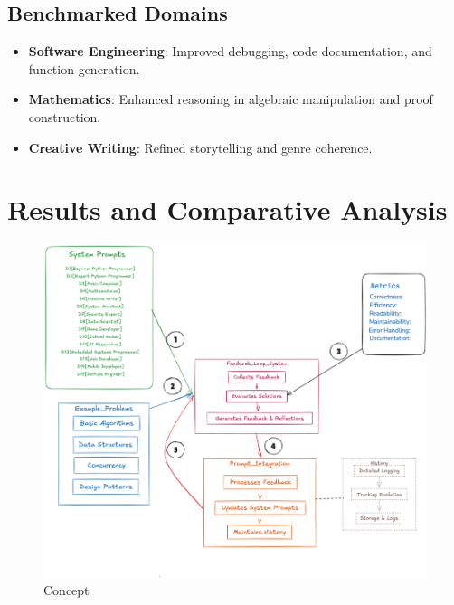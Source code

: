 \documentclass[10pt,a4paper,twocolumn]{article}
\begin{document}
\subsection{Benchmarked Domains}



\begin{itemize}
    \item \textbf{Software Engineering}: Improved debugging, code documentation, and function generation.
    \item \textbf{Mathematics}: Enhanced reasoning in algebraic manipulation and proof construction.
    \item \textbf{Creative Writing}: Refined storytelling and genre coherence.
\end{itemize}





\section{{\textbf{Results and Comparative Analysis} } }


\begin{figure}
    \centering
    \includegraphics[width=1\linewidth]{concept.png}
    \caption{Concept}
    \label{concept}
\end{figure}
\end{document}

